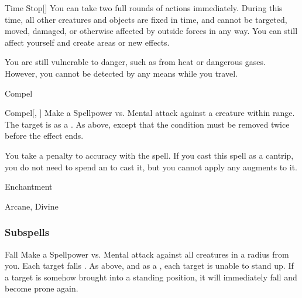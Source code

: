 \begin{ability}[\nth{9}]{Time Stop}[]
You can take two full rounds of actions immediately.
During this time, all other creatures and objects are fixed in time, and cannot be targeted, moved, damaged, or otherwise affected by outside forces in any way.
You can still affect yourself and create areas or new effects.

You are still vulnerable to danger, such as from heat or dangerous gases.
However, you cannot be detected by any means while you travel.
\end{ability}
\vspace{0.25em}

\newpage
\begin{spellsection}{Compel}

\begin{spellheader}
\end{spellheader}


\begin{ability}{Compel}[, ]
Make a Spellpower vs. Mental attack against a creature within \rngmed range.
\hit The target is \immobilized as a .
\crit As above, except that the condition must be removed twice before the effect ends.
\end{ability}



You take a  penalty to accuracy with the spell.
If you cast this spell as a cantrip,
you do not need to spend an  to cast it,
but you cannot apply any augments to it.


 Enchantment

 Arcane, Divine
\end{spellsection}


\subsubsection{Subspells}


\begin{ability}[\nth{1}]{Fall}
Make a Spellpower vs. Mental attack against all creatures in a \areamed radius from you.
\hit Each target falls .
\hit As above, and as a , each target is unable to stand up.
If a target is somehow brought into a standing position, it will immediately fall and become prone again.
\end{ability}
\vspace{0.25em}


